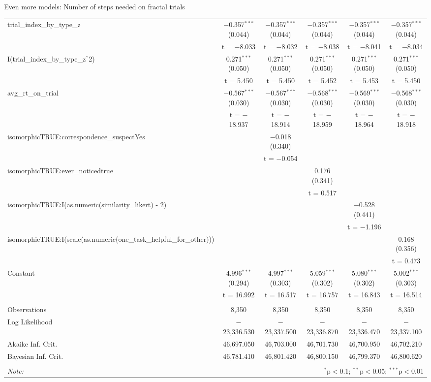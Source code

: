 \documentclass{beamer}
\begin{document}
\begin{frame}{Even more models: Number of steps needed on fractal trials}
\begin{center}
{\begin{tabular}{@{\extracolsep{5pt}}lccccc}
  trial\_index\_by\_type\_z & $-$0.357$^{***}$ (0.044) & $-$0.357$^{***}$ (0.044) & $-$0.357$^{***}$ (0.044) & $-$0.357$^{***}$ (0.044) & $-$0.357$^{***}$ (0.044) \\ 
  & t = $-$8.033 & t = $-$8.032 & t = $-$8.038 & t = $-$8.041 & t = $-$8.034 \\ 
  I(trial\_index\_by\_type\_z$\hat{\mkern6mu}$2) & 0.271$^{***}$ (0.050) & 0.271$^{***}$ (0.050) & 0.271$^{***}$ (0.050) & 0.271$^{***}$ (0.050) & 0.271$^{***}$ (0.050) \\ 
  & t = 5.450 & t = 5.450 & t = 5.452 & t = 5.453 & t = 5.450 \\ 
  avg\_rt\_on\_trial & $-$0.567$^{***}$ (0.030) & $-$0.567$^{***}$ (0.030) & $-$0.568$^{***}$ (0.030) & $-$0.569$^{***}$ (0.030) & $-$0.568$^{***}$ (0.030) \\ 
  & t = $-$18.937 & t = $-$18.914 & t = $-$18.959 & t = $-$18.964 & t = $-$18.918 \\ 
  isomorphicTRUE:correspondence\_suspectYes &  & $-$0.018 (0.340) &  &  &  \\ 
  &  & t = $-$0.054 &  &  &  \\ 
  isomorphicTRUE:ever\_noticedtrue &  &  & 0.176 (0.341) &  &  \\ 
  &  &  & t = 0.517 &  &  \\ 
  isomorphicTRUE:I(as.numeric(similarity\_likert) - 2) &  &  &  & $-$0.528 (0.441) &  \\ 
  &  &  &  & t = $-$1.196 &  \\ 
  isomorphicTRUE:I(scale(as.numeric(one\_task\_helpful\_for\_other))) &  &  &  &  & 0.168 (0.356) \\ 
  &  &  &  &  & t = 0.473 \\ 
  Constant & 4.996$^{***}$ (0.294) & 4.997$^{***}$ (0.303) & 5.059$^{***}$ (0.302) & 5.080$^{***}$ (0.302) & 5.002$^{***}$ (0.303) \\ 
  & t = 16.992 & t = 16.517 & t = 16.757 & t = 16.843 & t = 16.514 \\ 
 \hline \\[-1.8ex] 
Observations & 8,350 & 8,350 & 8,350 & 8,350 & 8,350 \\ 
Log Likelihood & $-$23,336.530 & $-$23,337.500 & $-$23,336.870 & $-$23,336.470 & $-$23,337.100 \\ 
Akaike Inf. Crit. & 46,697.050 & 46,703.000 & 46,701.730 & 46,700.950 & 46,702.210 \\ 
Bayesian Inf. Crit. & 46,781.410 & 46,801.420 & 46,800.150 & 46,799.370 & 46,800.620 \\ 
\hline 
\hline \\[-1.8ex] 
\textit{Note:}  & \multicolumn{5}{r}{$^{*}$p$<$0.1; $^{**}$p$<$0.05; $^{***}$p$<$0.01} \\ 
\end{tabular} 
} 
\end{center}

\end{frame}
\end{document}
